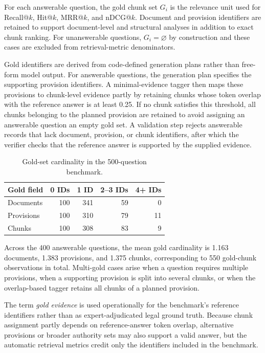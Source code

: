 For each answerable question, the gold chunk set $G_i$ is the relevance unit used for Recall@$k$, Hit@$k$, MRR@$k$, and nDCG@$k$. Document and provision identifiers are retained to support document-level and structural analyses in addition to exact chunk ranking. For unanswerable questions, $G_i=\varnothing$ by construction and these cases are excluded from retrieval-metric denominators.

Gold identifiers are derived from code-defined generation plans rather than free-form model output. For answerable questions, the generation plan specifies the supporting provision identifiers. A minimal-evidence tagger then maps these provisions to chunk-level evidence partly by retaining chunks whose token overlap with the reference answer is at least 0.25. If no chunk satisfies this threshold, all chunks belonging to the planned provision are retained to avoid assigning an answerable question an empty gold set. A validation step rejects answerable records that lack document, provision, or chunk identifiers, after which the verifier checks that the reference answer is supported by the supplied evidence.

\begin{table}[t]
\centering
\scriptsize
\caption{Gold-set cardinality in the 500-question benchmark.}
\label{tab:gold-cardinality}

\begin{tabular}{lrrrr}
\toprule
\textbf{Gold field} & \textbf{0 IDs} & \textbf{1 ID} & \textbf{2--3 IDs} & \textbf{4+ IDs} \\
\midrule
Documents & 100 & 341 & 59 & 0 \\
Provisions & 100 & 310 & 79 & 11 \\
Chunks & 100 & 308 & 83 & 9 \\
\bottomrule
\end{tabular}
\end{table}

Across the 400 answerable questions, the mean gold cardinality is 1.163 documents, 1.383 provisions, and 1.375 chunks, corresponding to 550 gold-chunk observations in total. Multi-gold cases arise when a question requires multiple provisions, when a supporting provision is split into several chunks, or when the overlap-based tagger retains all chunks of a planned provision.

The term \textit{gold evidence} is used operationally for the benchmark's reference identifiers rather than as expert-adjudicated legal ground truth. Because chunk assignment partly depends on reference-answer token overlap, alternative provisions or broader authority sets may also support a valid answer, but the automatic retrieval metrics credit only the identifiers included in the benchmark.

